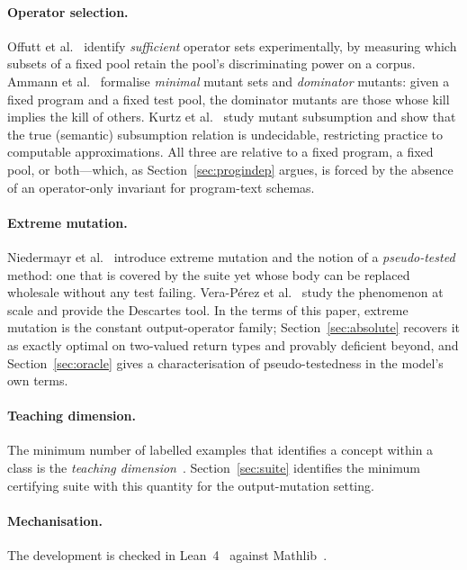 \documentclass[runningheads,envcountsect,envcountsame]{llncs}
\begin{document}
\paragraph{Operator selection.}
Offutt et al.~\cite{offutt1996} identify \emph{sufficient} operator sets
experimentally, by measuring which subsets of a fixed pool retain the pool's
discriminating power on a corpus. Ammann et al.~\cite{ammann2014} formalise
\emph{minimal} mutant sets and \emph{dominator} mutants: given a fixed program
and a fixed test pool, the dominator mutants are those whose kill implies the
kill of others. Kurtz et al.~\cite{kurtz2015} study mutant subsumption and show
that the true (semantic) subsumption relation is undecidable, restricting
practice to computable approximations. All three are relative to a fixed program,
a fixed pool, or both---which, as Section~\ref{sec:progindep} argues, is forced by
the absence of an operator-only invariant for program-text schemas.

\paragraph{Extreme mutation.}
Niedermayr et al.~\cite{niedermayr2016} introduce extreme mutation and the notion
of a \emph{pseudo-tested} method: one that is covered by the suite yet whose body
can be replaced wholesale without any test failing. Vera-P\'erez et
al.~\cite{veraperez2018} study the phenomenon at scale and provide the Descartes
tool. In the terms of this paper, extreme mutation is the constant
output-operator family; Section~\ref{sec:absolute} recovers it as exactly optimal
on two-valued return types and provably deficient beyond, and
Section~\ref{sec:oracle} gives a characterisation of pseudo-testedness in the
model's own terms.

\paragraph{Teaching dimension.}
The minimum number of labelled examples that identifies a concept within a class
is the \emph{teaching dimension}~\cite{goldman1995}. Section~\ref{sec:suite}
identifies the minimum certifying suite with this quantity for the
output-mutation setting.

\paragraph{Mechanisation.}
The development is checked in Lean~4~\cite{lean4} against Mathlib~\cite{mathlib}.
\end{document}

